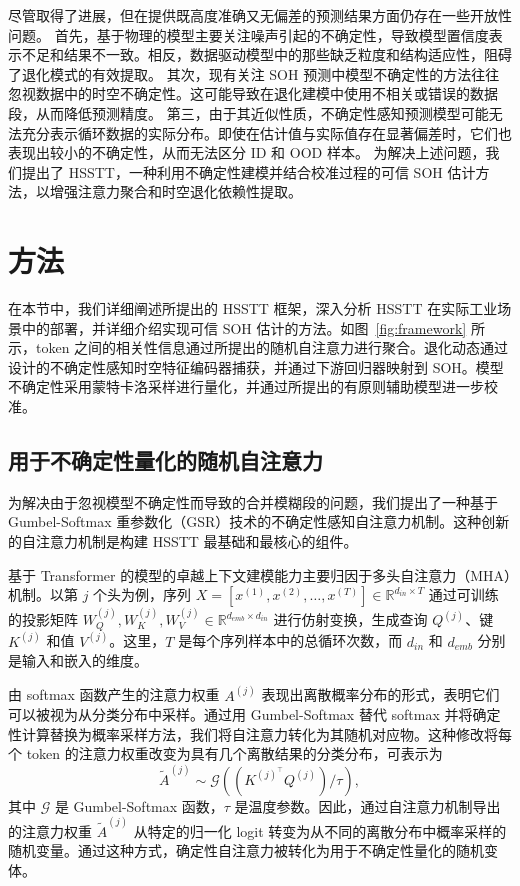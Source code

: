 \documentclass[UTF8,journal,twoside,web]{ieeecolor}
\begin{document}
尽管取得了进展，但在提供既高度准确又无偏差的预测结果方面仍存在一些开放性问题。
% 
首先，基于物理的模型主要关注噪声引起的不确定性，导致模型置信度表示不足和结果不一致。相反，数据驱动模型中的那些缺乏粒度和结构适应性，阻碍了退化模式的有效提取。
% 
其次，现有关注 SOH 预测中模型不确定性的方法往往忽视数据中的时空不确定性。这可能导致在退化建模中使用不相关或错误的数据段，从而降低预测精度。
% 
第三，由于其近似性质，不确定性感知预测模型可能无法充分表示循环数据的实际分布。即使在估计值与实际值存在显著偏差时，它们也表现出较小的不确定性，从而无法区分 ID 和 OOD 样本。
% 
为解决上述问题，我们提出了 HSSTT，一种利用不确定性建模并结合校准过程的可信 SOH 估计方法，以增强注意力聚合和时空退化依赖性提取。


\section{方法}\label{sec:methodology}

在本节中，我们详细阐述所提出的 HSSTT 框架，深入分析 HSSTT 在实际工业场景中的部署，并详细介绍实现可信 SOH 估计的方法。如图~\ref{fig:framework} 所示，token 之间的相关性信息通过所提出的随机自注意力进行聚合。退化动态通过设计的不确定性感知时空特征编码器捕获，并通过下游回归器映射到 SOH。模型不确定性采用蒙特卡洛采样进行量化，并通过所提出的有原则辅助模型进一步校准。

\subsection{用于不确定性量化的随机自注意力}\label{subsec:stochastic_attention}

为解决由于忽视模型不确定性而导致的合并模糊段的问题，我们提出了一种基于 Gumbel-Softmax 重参数化（GSR）技术的不确定性感知自注意力机制。这种创新的自注意力机制是构建 HSSTT 最基础和最核心的组件。

基于 Transformer 的模型的卓越上下文建模能力主要归因于多头自注意力（MHA）机制。以第 $j$ 个头为例，序列 $X=[x^{(1)}, x^{(2)}, \ldots, x^{(T)}] \in \mathbb{R}^{d_{in} \times T}$ 通过可训练的投影矩阵 $W_{Q}^{(j)}, W_{K}^{(j)}, W_{V}^{(j)} \in \mathbb{R}^{d_{emb} \times d_{in}}$ 进行仿射变换，生成查询 $Q^{(j)}$、键 $K^{(j)}$ 和值 $V^{(j)}$。这里，$T$ 是每个序列样本中的总循环次数，而 $d_{in}$ 和 $d_{emb}$ 分别是输入和嵌入的维度。

由 softmax 函数产生的注意力权重 $A^{(j)}$ 表现出离散概率分布的形式，表明它们可以被视为从分类分布中采样\cite{20193407356730, 20230613569727}。通过用 Gumbel-Softmax 替代 softmax 并将确定性计算替换为概率采样方法，我们将自注意力转化为其随机对应物。这种修改将每个 token 的注意力权重改变为具有几个离散结果的分类分布，可表示为
\begin{equation}
\tilde{A}^{(j)}\sim\mathcal{G}((K^{(j)^\top}Q^{(j)}) / \tau),
\label{eq:gumbel-softmax-attention}
\end{equation}%
其中 $\mathcal{G}$ 是 Gumbel-Softmax 函数，$\tau$ 是温度参数。因此，通过自注意力机制导出的注意力权重 $\tilde{A}^{(j)}$ 从特定的归一化 logit 转变为从不同的离散分布中概率采样的随机变量。通过这种方式，确定性自注意力被转化为用于不确定性量化的随机变体。
\end{document}
